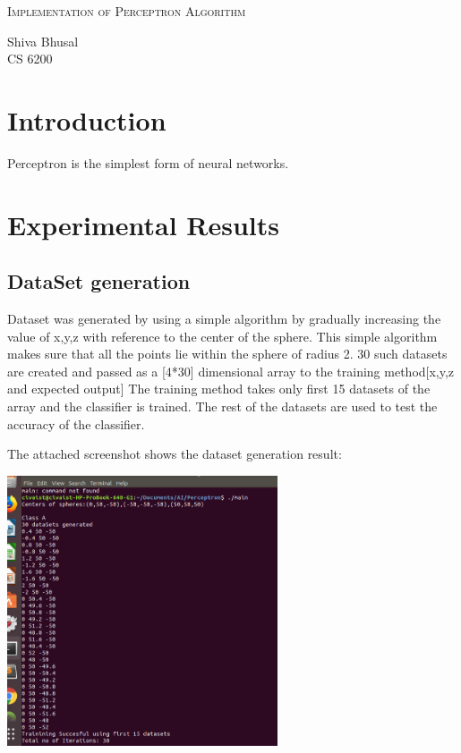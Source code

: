 \documentclass[letterpaper]{article}
\newcommand{\reporttitle}{Implementation of Perceptron Algorithm}
\newcommand{\name}{Shiva Bhusal}
\newcommand{\course}{CS 6200}
\begin{document}
\begin{center}{\huge \scshape \reporttitle}\end{center}
\begin{center}\vspace{0.2em} {\Large \name\\}
  {\course}\end{center}
  
  
  \section{Introduction}
  Perceptron is the simplest form of neural networks. 

  \section {Experimental Results}
  \subsection {DataSet generation}
  Dataset was generated by using a simple algorithm by gradually increasing the value of x,y,z with reference to the center of the sphere. This simple algorithm makes sure that all the points lie within the sphere of radius 2. 30 such datasets are created and passed as a [4*30] dimensional array to the training method[x,y,z and expected output] The training method takes only first 15 datasets of the array and the classifier is trained. The rest of the datasets are used to test the accuracy of the classifier. 

  The attached screenshot shows the dataset generation result: 

  \includegraphics[width=8cm,height=8cm]{Dataset_generation}
  
\end{document}

